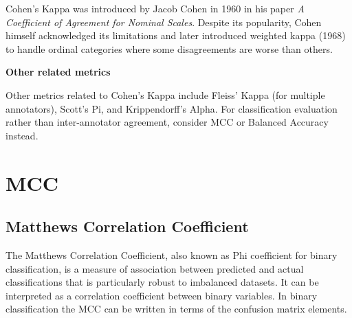{Cohen's Kappa was introduced by Jacob Cohen in 1960 in his paper \textit{A Coefficient of Agreement for Nominal Scales}. Despite its popularity, Cohen himself
acknowledged its limitations and later introduced weighted kappa (1968) to handle ordinal categories where some disagreements are worse than others.}

\textbf{Other related metrics}

Other metrics related to Cohen's Kappa include Fleiss' Kappa (for multiple annotators), Scott's Pi, and Krippendorff's Alpha. For classification evaluation rather than
inter-annotator agreement, consider MCC or Balanced Accuracy instead.

\clearpage
\thispagestyle{classificationstyle}
\section{MCC}
\subsection{Matthews Correlation Coefficient}

The Matthews Correlation Coefficient, also known as Phi coefficient for binary classification, is a measure of association between predicted and actual classifications
that is particularly robust to imbalanced datasets. It can be interpreted as a correlation coefficient between binary variables. In binary classification the MCC can
be written in terms of the confusion matrix elements.

\begin{center}
\end{center}

